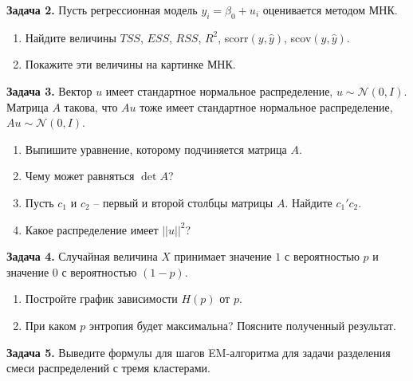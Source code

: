 \documentclass[10pt, a4paper]{extarticle}
\begin{document}
	{\large \textbf{Задача 2.}} Пусть регрессионная модель $y_i = \beta_0 + u_i$ оценивается методом МНК. 
	\begin{enumerate}
		\item Найдите величины $TSS$, $ESS$, $RSS$, $R^2$, scorr$(y, \hat{y})$, scov$(y, \hat{y})$.
		\item Покажите эти величины на картинке МНК.
	\end{enumerate}
	\vspace{1em}
	
	{\large \textbf{Задача 3.}} Вектор $u$ имеет стандартное нормальное распределение, $u \sim \mathcal{N}(0, I)$. Матрица $A$ такова, что $Au$ тоже имеет стандартное нормальное распределение, $Au \sim \mathcal{N}(0, I)$.
	\begin{enumerate}
		\item Выпишите уравнение, которому подчиняется матрица $A$.
		\item Чему может равняться $\det A$?
		\item Пусть $c_1$ и $c_2$ -- первый и второй столбцы матрицы $A$. Найдите $c_1'c_2$.
		\item Какое распределение имеет $||u||^2$?
	\end{enumerate}

	{\large \textbf{Задача 4.}} Случайная величина $X$ принимает значение $1$ с вероятностью $p$ и значение $0$ с вероятностью $(1-p)$.
	\begin{enumerate}
		\item Постройте график зависимости $H(p)$ от $p$.
		\item При каком $p$ энтропия будет максимальна? Поясните полученный результат.
	\end{enumerate}

	{\large \textbf{Задача 5.}} Выведите формулы для шагов EM-алгоритма для задачи разделения смеси распределений с тремя кластерами.
	
\end{document}
